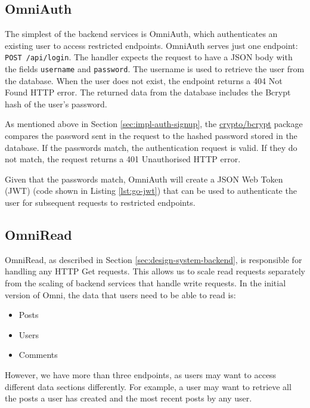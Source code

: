 \subsection{OmniAuth}
The simplest of the backend services is OmniAuth, which authenticates an existing user to access restricted endpoints.
OmniAuth serves just one endpoint: \verb|POST /api/login|. The handler expects the request to have a JSON body with the fields \verb|username| and \verb|password|. 
The username is used to retrieve the user from the database. When the user does not exist, the endpoint returns a 404 Not Found HTTP error.
The returned data from the database includes the Bcrypt hash of the user's password. 

As mentioned above in Section \ref{sec:impl-auth-signup}, the \underline{\href{https://pkg.go.dev/golang.org/x/crypto/bcrypt}{crypto/bcrypt}} \nocite{gobcryptpkg} package compares the password sent in the request to the hashed password stored in the database.
If the passwords match, the authentication request is valid. If they do not match, the request returns a 401 Unauthorised HTTP error.

Given that the passwords match, OmniAuth will create a JSON Web Token (JWT) (code shown in Listing \ref{lst:go-jwt}) that can be used to authenticate the user for subsequent requests to restricted endpoints.



\subsection{OmniRead}
OmniRead, as described in Section \ref{sec:design-system-backend}, is responsible for handling any HTTP Get requests. This allows us to scale read requests separately from the scaling of backend services that handle write requests.
In the initial version of Omni, the data that users need to be able to read is: 
\begin{itemize}
    \item Posts
    \item Users
    \item Comments
\end{itemize}
However, we have more than three endpoints, as users may want to access different data sections differently. For example, a user may want to retrieve all the posts a user has created and the most recent posts by any user. 

